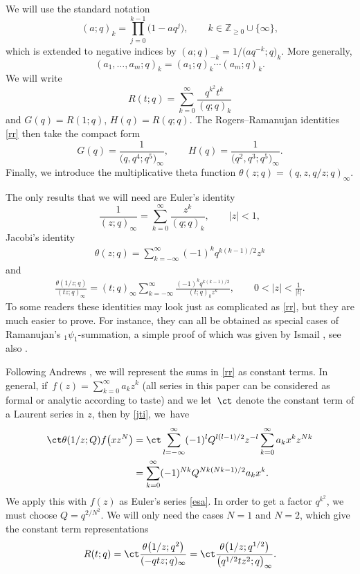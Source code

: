 We will use the standard notation
\begin{equation*}
(a;q)_k=\prod_{j=0}^{k-1}\bigl(1-aq^j\bigr),\qquad k\in\mathbb Z_{\geq 0}\cup\{\infty\}, \end{equation*}
which is extended to negative indices by $(a;q)_{-k}=1/\bigl(aq^{-k};q\bigr)_k$. More generally,
\begin{equation*}(a_1,\dots,a_m;q)_k=(a_1;q)_k\dotsm (a_m;q)_k. \end{equation*}
We will write
\begin{equation*}R(t;q)=\sum_{k=0}^\infty\frac{q^{k^2}t^k}{(q;q)_k} \end{equation*}
and $G(q)=R(1;q)$, $H(q)=R(q;q)$.
The Rogers--Ramanujan identities \eqref{rr} then take the compact form
\[%
G(q)=\frac 1{\bigl(q,q^4;q^5\bigr)_\infty},\qquad H(q)=\frac 1{\bigl(q^2,q^3;q^5\bigr)_\infty}.
\]
Finally, we introduce the multiplicative theta function $\theta(z;q)=(q,z,q/z;q)_\infty$.

The only results that we will need are Euler's identity
\begin{equation}\label{esa}\frac 1{(z;q)_\infty}=\sum_{k=0}^\infty\frac{z^k}{(q;q)_k},\qquad |z|<1,\end{equation}
 Jacobi's identity
\begin{gather}\theta(z;q)=\sum_{k=-\infty}^\infty(-1)^kq^{k(k-1)/2}z^k \label{jti}
\end{gather}
and
\begin{gather}
\frac{\theta(1/z;q)}{(tz;q)_\infty}=(t;q)_\infty\sum_{k=-\infty}^{\infty}\frac{(-1)^kq^{k(k-1)/2}}{(t;q)_kz^k}, \qquad 0<|z|<\frac 1{|t|}.\label{rps}
\end{gather}
To some readers these identities may look just as complicated as \eqref{rr}, but they are much easier to prove. For instance, they can all be obtained as special cases of Ramanujan's ${}_1\psi_1$-summation, a simple proof of which was given by Ismail \cite{i}, see also \cite[Appendix~C]{a86}.


Following Andrews \cite{a86}, we will represent the sums in \eqref{rr} as constant terms. In general, if~${f(z)=\sum_{k=0}^\infty a_k z^k}$
 (all series in this paper can be considered as formal or analytic according to taste)
and we let~$\ct$ denote the constant term of a Laurent series in $z$, then by \eqref{jti}, we~have%
\begin{align}
\ct \theta(1/z;Q)f\bigl(xz^N\bigr)&=\ct \sum_{l=-\infty}^\infty (-1)^lQ^{l(l-1)/2}z^{-l}\sum_{k=0}^\infty a_k x^kz^{Nk}\nonumber\\
&=\sum_{k=0}^\infty
(-1)^{Nk}Q^{Nk(Nk-1)/2}a_k x^k.\label{fexp}
\end{align}
We apply this with $f(z)$ as Euler's series \eqref{esa}. In order to get a factor $q^{k^2}$, we must choose $Q=q^{2/N^2}$. We will only need the cases $N=1$ and $N=2$, which give the constant term representations
\begin{equation*}R(t;q)
=\ct\frac{\theta\bigl(1/z;q^{2}\bigr)}{ (-qtz;q)_\infty}
=\ct\frac{\theta\bigl(1/z;q^{1/2}\bigr)}{ \bigl(q^{1/2}tz^2;q\bigr)_\infty}.
\end{equation*}

